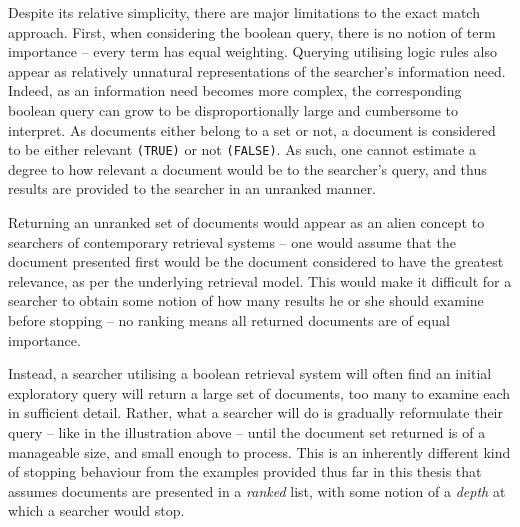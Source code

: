 Despite its relative simplicity, there are major limitations to the exact match approach. First, when considering the boolean query, there is no notion of term importance -- every term has equal weighting. Querying utilising logic rules also appear as relatively unnatural representations of the searcher's information need. Indeed, as an information need becomes more complex, the corresponding boolean query can grow to be disproportionally large and cumbersome to interpret. As documents either belong to a set or not, a document is considered to be either relevant \texttt{(TRUE)} or not \texttt{(FALSE)}. As such, one cannot estimate a degree to how relevant a document would be to the searcher's query, and thus results are provided to the searcher in an unranked manner.

Returning an unranked set of documents would appear as an alien concept to searchers of contemporary retrieval systems -- one would assume that the document presented first would be the document considered to have the greatest relevance, as per the underlying retrieval model. This would make it difficult for a searcher to obtain some notion of how many results he or she should examine before stopping -- no ranking means all returned documents are of equal importance. 

\begin{figure}[h]
    \centering
    \vspace{4mm}
    \label{fig:searchbox}
    \vspace{-5mm}
\end{figure}

Instead, a searcher utilising a boolean retrieval system will often find an initial exploratory query will return a large set of documents, too many to examine each in sufficient detail. Rather, what a searcher will do is gradually reformulate their query -- like in the illustration above -- until the document set returned is of a manageable size, and small enough to process. This is an inherently different kind of stopping behaviour from the examples provided thus far in this thesis that assumes documents are presented in a \emph{ranked} list, with some notion of a \emph{depth} at which a searcher would stop.

